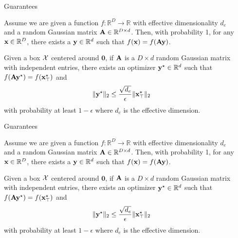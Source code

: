 \documentclass[final]{beamer}
\begin{document}
\begin{frame}[t]
\begin{columns}[T]
\begin{column}{.48\textwidth}
\end{column}

\begin{column}{.48\textwidth}
\begin{block}{Guarantees}
\begin{theorem}
   \label{prop:1}
   Assume we are given a function $f: \mathbb{R}^{D} \rightarrow \mathbb{R}$ with effective dimensionality $d_e$ and a random Gaussian matrix $\mathbf{A} \in \mathbb{R}^{D\times d}$. Then, with probability 1, for any $\mathbf{x} \in \mathbb{R}^D$, there exists a $ \mathbf{y} \in \mathbb{R}^d$ such that $f(\mathbf{x}) = f(\mathbf{A}\mathbf{y})$.
  \end{theorem}

 \begin{theorem}
   \label{prop:2}
   Given a box $\cal X$ centered around $\mathbf{0}$, if $\mathbf{A}$ is a $D\times d$ random Gaussian matrix 
   with independent entries,
   there exists an optimizer $\mathbf{y}^\star \in \mathbb{R}^{d}$ such that $f(\mathbf{A}\mathbf{y}^\star) = f(\mathbf{x}^\star_\top)$ and $$\|\mathbf{y}^\star\|_2 \leq \frac{\sqrt{d_e}}{\epsilon}\|\mathbf{x}^{\star}_\top\|_2$$ with probability at least $1-\epsilon$ where $d_e$ is
   the effective dimension.
 \end{theorem}
\end{block}




\begin{block}{Guarantees}
\begin{theorem}
   \label{prop:1}
   Assume we are given a function $f: \mathbb{R}^{D} \rightarrow \mathbb{R}$ with effective dimensionality $d_e$ and a random Gaussian matrix $\mathbf{A} \in \mathbb{R}^{D\times d}$. Then, with probability 1, for any $\mathbf{x} \in \mathbb{R}^D$, there exists a $ \mathbf{y} \in \mathbb{R}^d$ such that $f(\mathbf{x}) = f(\mathbf{A}\mathbf{y})$.
  \end{theorem}

 \begin{theorem}
   \label{prop:2}
   Given a box $\cal X$ centered around $\mathbf{0}$, if $\mathbf{A}$ is a $D\times d$ random Gaussian matrix 
   with independent entries,
   there exists an optimizer $\mathbf{y}^\star \in \mathbb{R}^{d}$ such that $f(\mathbf{A}\mathbf{y}^\star) = f(\mathbf{x}^\star_\top)$ and $$\|\mathbf{y}^\star\|_2 \leq \frac{\sqrt{d_e}}{\epsilon}\|\mathbf{x}^{\star}_\top\|_2$$ with probability at least $1-\epsilon$ where $d_e$ is
   the effective dimension.
 \end{theorem}
\end{block}


\end{column}
\end{columns}
\end{frame}
\end{document}

